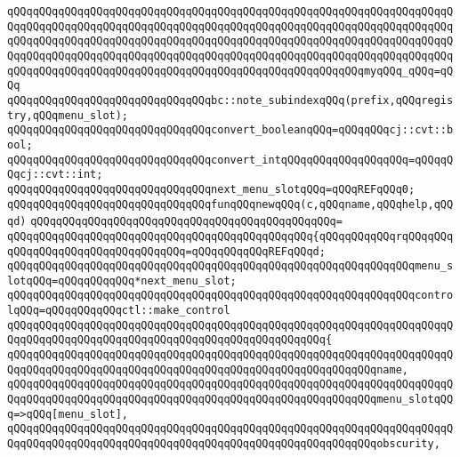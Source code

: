\verb|qQQqqQQqqQQqqQQqqQQqqQQqqQQqqQQqqQQqqQQqqQQqqQQqqQQqqQQqqQQqqQQqqQQqqQQqqQQqqQQqqQQqqQQqqQQqqQQqqQQqqQQqqQQqqQQqqQQqqQQqqQQqqQQqqQQqqQQqqQQqqQQqqQQqqQQqqQQqqQQqqQQqqQQqqQQqqQQqqQQqqQQqqQQqqQQqqQQqqQQqqQQqqQQqqQQqqQQqqQQqqQQqqQQqqQQqqQQqqQQqqQQqqQQqqQQqqQQqqQQqqQQqqQQqqQQqqQQqqQQqqQQqqQQqqQQqqQQqqQQqqQQqqQQqqQQqqQQqqQQqqQQqqQQqqQQqqQQqmyqQQq_qQQq=qQQq|\newline
\verb|qQQqqQQqqQQqqQQqqQQqqQQqqQQqqQQqbc::note_subindexqQQq(prefix,qQQqregistry,qQQqmenu_slot);|\newline
\newline
\verb|qQQqqQQqqQQqqQQqqQQqqQQqqQQqqQQqconvert_booleanqQQq=qQQqqQQqcj::cvt::bool;|\newline
\verb|qQQqqQQqqQQqqQQqqQQqqQQqqQQqqQQqconvert_intqQQqqQQqqQQqqQQqqQQq=qQQqqQQqcj::cvt::int;|\newline
\newline
\verb|qQQqqQQqqQQqqQQqqQQqqQQqqQQqqQQqnext_menu_slotqQQq=qQQqREFqQQq0;|\newline
\newline
\verb|qQQqqQQqqQQqqQQqqQQqqQQqqQQqqQQqfunqQQqnewqQQq(c,qQQqname,qQQqhelp,qQQqd)|\newline
\verb|qQQqqQQqqQQqqQQqqQQqqQQqqQQqqQQqqQQqqQQqqQQqqQQq=|\newline
\verb|qQQqqQQqqQQqqQQqqQQqqQQqqQQqqQQqqQQqqQQqqQQqqQQq{qQQqqQQqqQQqrqQQqqQQqqQQqqQQqqQQqqQQqqQQqqQQqqQQq=qQQqqQQqqQQqREFqQQqd;|\newline
\verb|qQQqqQQqqQQqqQQqqQQqqQQqqQQqqQQqqQQqqQQqqQQqqQQqqQQqqQQqqQQqqQQqmenu_slotqQQq=qQQqqQQqqQQq*next_menu_slot;|\newline
\newline
\verb|qQQqqQQqqQQqqQQqqQQqqQQqqQQqqQQqqQQqqQQqqQQqqQQqqQQqqQQqqQQqqQQqcontrolqQQq=qQQqqQQqqQQqctl::make_control|\newline
\verb|qQQqqQQqqQQqqQQqqQQqqQQqqQQqqQQqqQQqqQQqqQQqqQQqqQQqqQQqqQQqqQQqqQQqqQQqqQQqqQQqqQQqqQQqqQQqqQQqqQQqqQQqqQQqqQQqqQQqqQQq{|\newline
\verb|qQQqqQQqqQQqqQQqqQQqqQQqqQQqqQQqqQQqqQQqqQQqqQQqqQQqqQQqqQQqqQQqqQQqqQQqqQQqqQQqqQQqqQQqqQQqqQQqqQQqqQQqqQQqqQQqqQQqqQQqqQQqqQQqname,|\newline
\verb|qQQqqQQqqQQqqQQqqQQqqQQqqQQqqQQqqQQqqQQqqQQqqQQqqQQqqQQqqQQqqQQqqQQqqQQqqQQqqQQqqQQqqQQqqQQqqQQqqQQqqQQqqQQqqQQqqQQqqQQqqQQqqQQqmenu_slotqQQq=>qQQq[menu_slot],|\newline
\verb|qQQqqQQqqQQqqQQqqQQqqQQqqQQqqQQqqQQqqQQqqQQqqQQqqQQqqQQqqQQqqQQqqQQqqQQqqQQqqQQqqQQqqQQqqQQqqQQqqQQqqQQqqQQqqQQqqQQqqQQqqQQqqQQqobscurity,|\newline
